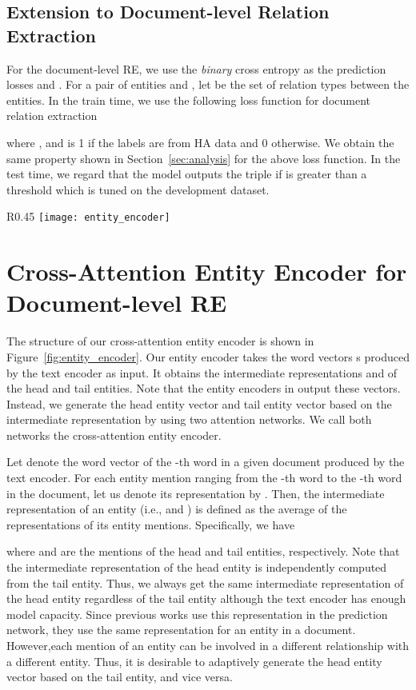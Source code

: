 \documentclass[11pt]{article}
\newcommand{\head}{\xspace}
\newcommand{\tail}{\xspace}
\renewcommand{\figurename}{Figure}
\begin{document}
\subsection{Extension to Document-level Relation Extraction}
For the document-level RE, we use the \emph{binary} cross entropy as the prediction losses  and .
For a pair of entities \head and \tail, let  be the set of relation types between the entities.
In the train time, we use the following loss function for document relation extraction
\vspace{-0.1in}

where  , and  is 1 if the labels are from HA data and 0 otherwise.
We obtain the same property shown in Section~\ref{sec:analysis} for the above loss function.
In the test time, we regard that the model outputs the triple  if  is greater than a threshold which is tuned on the development dataset. 
 

\begin{wrapfigure}{R}{0.45\textwidth}
\texttt{[image: entity\_encoder]}
\caption{Cross-attention entity encoder \label{fig:entity_encoder}}
\end{wrapfigure}


\section{Cross-Attention Entity Encoder for Document-level RE}
The structure of our cross-attention entity encoder is shown in \figurename~\ref{fig:entity_encoder}.
Our entity encoder takes the word vectors s produced by the text encoder as input.
It obtains the intermediate representations  and  of the head and tail entities.
Note that the entity encoders in \cite{yao2019docred,wang2019fine} output these vectors.
Instead, we generate the head entity vector  and tail entity vector  based on the intermediate representation by using two attention networks.
We call both networks the cross-attention entity encoder.



Let  denote the word vector of the -th word in a given document produced by the text encoder.
For each entity mention  ranging from the -th word to the -th word in the document, let us denote its representation  by . Then, the intermediate representation of an entity (i.e.,  and ) is defined as the average of the representations of its entity mentions.
Specifically, we have

where  and  are the mentions of the head and tail entities, respectively.
Note that the intermediate representation of the head entity  is independently computed from the tail entity.
Thus, we always get the same intermediate representation of the head entity regardless of the tail entity although the text encoder has enough model capacity.
Since previous works \cite{yao2019docred,wang2019fine} use this representation in the prediction network, they use the same representation for an entity in a document.
However,each mention of an entity can be involved in a different relationship with a different entity.
Thus, it is desirable to adaptively generate the head entity vector based on the tail entity, and vice versa.
\end{document}
